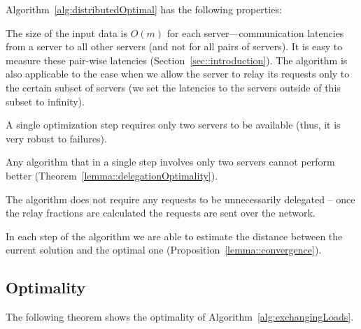 \documentclass[11pt]{article}
\begin{document}
Algorithm~\ref{alg:distributedOptimal} has the following properties: 
\begin{inparaenum}[(i)] 
\item The size of the input data is $O(m)$ for each server---communication latencies from a server to all other servers (and not for all pairs of servers). It is easy to measure these pair-wise latencies (Section~\ref{sec::introduction}). The algorithm is also applicable to the case when we allow the server to relay its requests only to the certain subset of servers (we set the latencies to the servers outside of this subset to infinity).
\item A single optimization step requires only two servers to be available (thus, it is very robust to failures).
\item Any algorithm that in a single step involves only two servers cannot perform better (Theorem~\ref{lemma::delegationOptimality}).
\item The algorithm does not require any requests to be unnecessarily delegated -- once the relay fractions are calculated the requests are sent over the network.
\item In each step of the algorithm we are able to estimate the distance between the current solution and the optimal one (Proposition~\ref{lemma::convergence}).
\end{inparaenum}


\subsection{Optimality}

The following theorem shows the optimality of Algorithm~\ref{alg:exchangingLoads}.
\end{document}
